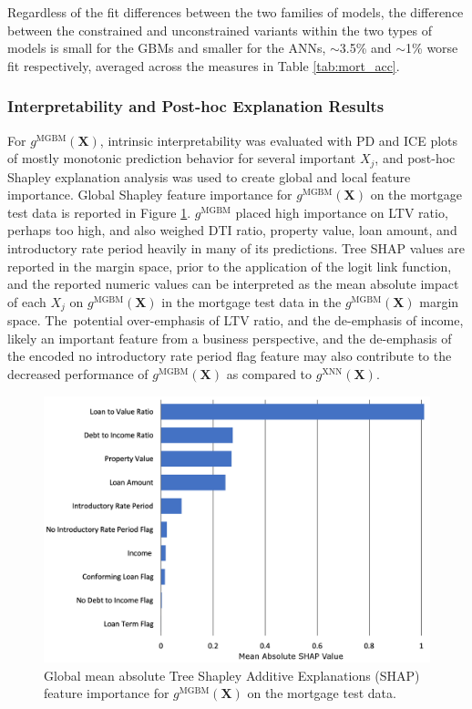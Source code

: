 \documentclass[information,article,accept,moreauthors,pdftex]{Definitions/mdpi}
\begin{document}
{{{ Regardless of the fit differences between the two families of models, the difference between the constrained and unconstrained variants within the two types of models is small for the GBMs and smaller for the ANNs, $\sim$3.5\% and $\sim$1\% worse fit respectively, averaged across the measures in Table \ref{tab:mort_acc}.  

\subsubsection{Interpretability and Post-hoc Explanation Results}\label{ssec:int_ex_mort}

For $g^\text{MGBM}(\mathbf{X})$, intrinsic interpretability was evaluated with PD and ICE plots of mostly monotonic prediction behavior for several important $X_j$, and post-hoc Shapley explanation analysis was used to create global and local feature importance. Global Shapley feature importance for $g^\text{MGBM}(\mathbf{X})$ on the mortgage test data is reported in Figure \ref{fig:mort_mgbm_glob}. $g^\text{MGBM}$ placed high importance on LTV ratio, perhaps too high, and also weighed DTI ratio, property value, loan amount, and introductory rate period heavily in many of its predictions. Tree SHAP values are reported in the margin space, prior to the application of the logit link function, and the reported numeric values can be interpreted as the mean absolute impact of each $X_j$ on $g^\text{MGBM}(\mathbf{X})$ in the mortgage test data in the $g^\text{MGBM}(\mathbf{X})$ margin space. The~potential over-emphasis of LTV ratio, and the de-emphasis of income, likely an important feature from a business perspective, and the de-emphasis of the encoded no introductory rate period flag feature may also contribute to the decreased performance of $g^\text{MGBM}(\mathbf{X})$ as compared to $g^\text{XNN}(\mathbf{X})$.

\begin{figure}[H]
\centering
\includegraphics[width=12cm]{img/mort_mgbm_glob.png}
\caption{Global mean absolute Tree Shapley Additive Explanations (SHAP) feature importance for  $g^\text{MGBM}(\mathbf{X})$ on the mortgage test data.}
\label{fig:mort_mgbm_glob}
\end{figure} 

}}}
\end{document}
